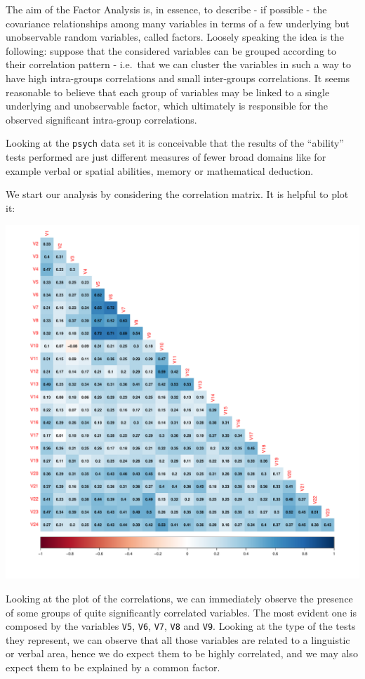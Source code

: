 \documentclass[
  letterpaper,
  DIV=11,
  numbers=noendperiod]{scrartcl}
\begin{document}
The aim of the Factor Analysis is, in essence, to describe - if possible
- the covariance relationships among many variables in terms of a few
underlying but unobservable random variables, called factors. Loosely
speaking the idea is the following: suppose that the considered
variables can be grouped according to their correlation pattern -
i.e.~that we can cluster the variables in such a way to have high
intra-groups correlations and small inter-groups correlations. It seems
reasonable to believe that each group of variables may be linked to a
single underlying and unobservable factor, which ultimately is
responsible for the observed significant intra-group correlations.

Looking at the \texttt{psych} data set it is conceivable that the
results of the ``ability'' tests performed are just different measures
of fewer broad domains like for example verbal or spatial abilities,
memory or mathematical deduction.

We start our analysis by considering the correlation matrix. It is
helpful to plot it:

\includegraphics{ProblemSet2_files/figure-pdf/unnamed-chunk-7-1.pdf}

Looking at the plot of the correlations, we can immediately observe the
presence of some groups of quite significantly correlated variables. The
most evident one is composed by the variables \texttt{V5}, \texttt{V6},
\texttt{V7}, \texttt{V8} and \texttt{V9}. Looking at the type of the
tests they represent, we can observe that all those variables are
related to a linguistic or verbal area, hence we do expect them to be
highly correlated, and we may also expect them to be explained by a
common factor.
\end{document}
